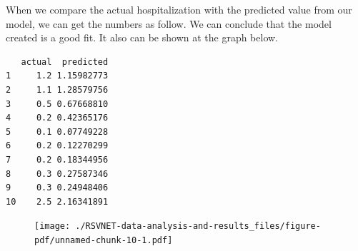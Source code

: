 \documentclass[
  letterpaper,
  DIV=11,
  numbers=noendperiod]{scrreport}
\newenvironment{Shaded}{\begin{snugshade}}{\end{snugshade}}
\newcommand{\AttributeTok}[1]{\textcolor[rgb]{0.40,0.45,0.13}{#1}}
\newcommand{\ConstantTok}[1]{\textcolor[rgb]{0.56,0.35,0.01}{#1}}
\newcommand{\DecValTok}[1]{\textcolor[rgb]{0.68,0.00,0.00}{#1}}
\newcommand{\FunctionTok}[1]{\textcolor[rgb]{0.28,0.35,0.67}{#1}}
\newcommand{\NormalTok}[1]{\textcolor[rgb]{0.00,0.23,0.31}{#1}}
\newcommand{\OtherTok}[1]{\textcolor[rgb]{0.00,0.23,0.31}{#1}}
\newcommand{\SpecialCharTok}[1]{\textcolor[rgb]{0.37,0.37,0.37}{#1}}
\begin{document}
When we compare the actual hospitalization with the predicted value from
our model, we can get the numbers as follow. We can conclude that the
model created is a good fit. It also can be shown at the graph below.

\begin{Shaded}
\end{Shaded}

\begin{verbatim}
   actual  predicted
1     1.2 1.15982773
2     1.1 1.28579756
3     0.5 0.67668810
4     0.2 0.42365176
5     0.1 0.07749228
6     0.2 0.12270299
7     0.2 0.18344956
8     0.3 0.27587346
9     0.3 0.24948406
10    2.5 2.16341891
\end{verbatim}

\begin{Shaded}
\end{Shaded}

\begin{figure}[H]

{\centering \texttt{[image: ./RSVNET-data-analysis-and-results\_files/figure-pdf/unnamed-chunk-10-1.pdf]}

}

\end{figure}
\end{document}
